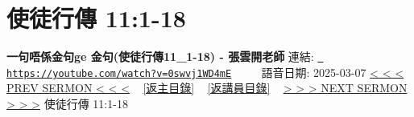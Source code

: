 \documentclass{book}
\begin{document}
\section{使徒行傳 11:1-18}
\label{sec:0swvj1WD4mE}
\textbf{一句唔係金句ge 金句(使徒行傳11\_1-18) - 張雲開老師}
\newline
\newline
連結: \href{https://youtube.com/watch?v=0swvj1WD4mE}{\texttt{ https://youtube.com/watch?v=0swvj1WD4mE}} ~~~~ 語音日期: 2025-03-07 
\newline
\newline
\hyperref[sec:zNZ0_TjZo3U]{< < < PREV SERMON < < <}
~
\hyperlink{toc}{[返主目錄]}
~
\hyperref[ch:preacher1]{[返講員目錄]}
~
\hyperref[sec:Ii_o05jkhEI]{> > > NEXT SERMON > > >}
\newline
\newline
使徒行傳 11:1-18
\newline
\end{document}
